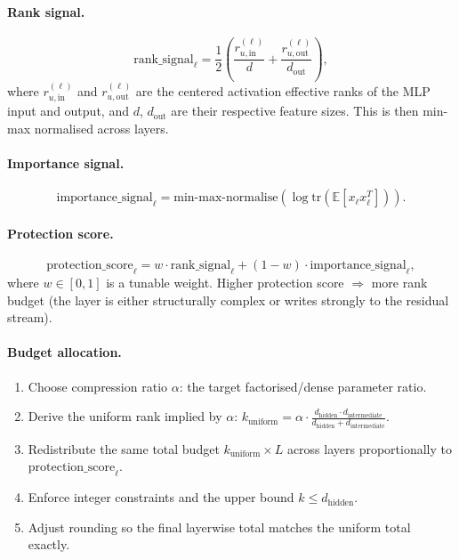 \documentclass[11pt]{article}
\begin{document}
\paragraph{Rank signal.}
\[
    \text{rank\_signal}_\ell = \frac{1}{2}\left(\frac{r_{u,\text{in}}^{(\ell)}}{d} + \frac{r_{u,\text{out}}^{(\ell)}}{d_{\text{out}}}\right),
\]
where $r_{u,\text{in}}^{(\ell)}$ and $r_{u,\text{out}}^{(\ell)}$ are the centered activation effective ranks of the MLP input and output, and $d$, $d_{\text{out}}$ are their respective feature sizes.  This is then min-max normalised across layers.

\paragraph{Importance signal.}
\[
    \text{importance\_signal}_\ell = \text{min-max-normalise}\left(\log \mathrm{tr}\left(\mathbb{E}\left[x_\ell x_\ell^T\right]\right)\right).
\]

\paragraph{Protection score.}
\[
    \text{protection\_score}_\ell = w \cdot \text{rank\_signal}_\ell + (1-w) \cdot \text{importance\_signal}_\ell,
\]
where $w \in [0,1]$ is a tunable weight.  Higher protection score $\Rightarrow$ more rank budget (the layer is either structurally complex or writes strongly to the residual stream).

\paragraph{Budget allocation.}
\begin{enumerate}
    \item Choose compression ratio $\alpha$: the target factorised/dense parameter ratio.
    \item Derive the uniform rank implied by $\alpha$: $k_{\text{uniform}} = \alpha \cdot \frac{d_{\text{hidden}} \cdot d_{\text{intermediate}}}{d_{\text{hidden}} + d_{\text{intermediate}}}$.
    \item Redistribute the same total budget $k_{\text{uniform}} \times L$ across layers proportionally to $\text{protection\_score}_\ell$.
    \item Enforce integer constraints and the upper bound $k \leq d_{\text{hidden}}$.
    \item Adjust rounding so the final layerwise total matches the uniform total exactly.
\end{enumerate}
\end{document}
